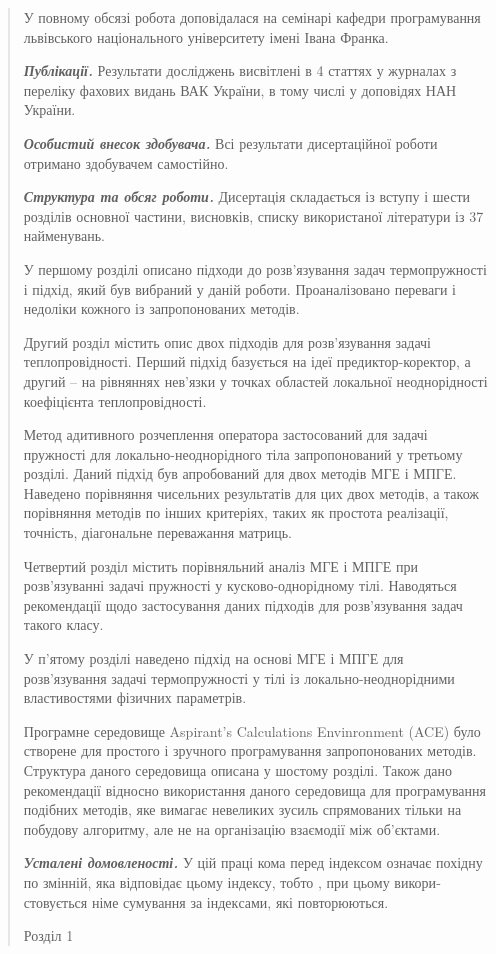 \begin{quote}
У повному обсязі робота доповідалася на семінарі кафедри програмування
львівського національного університету імені Івана Франка.

\emph{\textbf{Публікації.}} Результати досліджень висвітлені в 4 статтях
у журналах з переліку фахових видань ВАК України, в тому числі у
доповідях НАН України.

\emph{\textbf{Особистий внесок здобувача.}} Всі результати дисертаційної
роботи отримано здобувачем самостійно.

\emph{\textbf{Структура та обсяг роботи.}} Дисертація складається із
вступу і шести розділів основної частини, висновків, списку використаної
літератури із 37 найменувань.

У першому розділі описано підходи до розв'язування задач термопружності
і підхід, який був вибраний у даній роботи. Проаналізовано переваги і
недоліки кожного із запропонованих методів.

Другий розділ містить опис двох підходів для розв'язування задачі
теплопровідності. Перший підхід базується на ідеї предиктор-коректор, а
другий -- на рівняннях нев'язки у точках областей локальної
неоднорідності коефіцієнта теплопровідності.

Метод адитивного розчеплення оператора застосований для задачі пружності
для локально-неоднорідного тіла запропонований у третьому розділі. Даний
підхід був апробований для двох методів МГЕ і МПГЕ. Наведено порівняння
чисельних результатів для цих двох методів, а також порівняння методів
по інших критеріях, таких як простота реалізації, точність, діагональне
переважання матриць.

Четвертий розділ містить порівняльний аналіз МГЕ і МПГЕ при
розв'язуванні задачі пружності у кусково-однорідному тілі. Наводяться
рекомендації щодо застосування даних підходів для розв'язування задач
такого класу.

У п'ятому розділі наведено підхід на основі МГЕ і МПГЕ для розв'язування
задачі термопружності у тілі із локально-неоднорідними властивостями
фізичних параметрів.

Програмне середовище Aspirant's Calculations Envinronment (ACE) було
створене для простого і зручного програмування запропонованих методів.
Структура даного середовища описана у шостому розділі. Також дано
рекомендації відносно використання даного середовища для програмування
подібних методів, яке вимагає невеликих зусиль спрямованих тільки на
побудову алгоритму, але не на організацію взаємодії між об'єктами.

\emph{\textbf{Усталені домовленості.}} У цій праці кома перед індексом
означає похідну по змінній, яка відповідає цьому індексу, тобто , при
цьому викори­стовується німе сумування за індек­сами, які повторюються.

Розділ 1
\end{quote}

